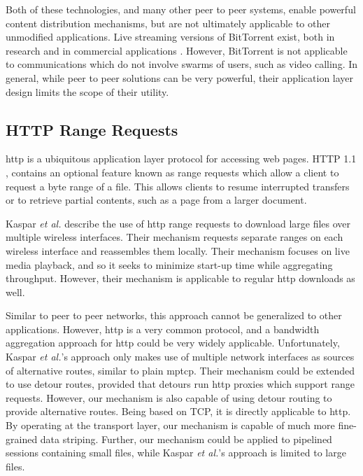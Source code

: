 \documentclass{cwru}
\begin{document}
Both of these technologies, and many other peer to peer systems, enable powerful
content distribution mechanisms, but are not ultimately applicable to other
unmodified applications. Live streaming versions of BitTorrent exist, both in
research \cite{mol2009design} and in commercial applications
\cite{ruckert2014clubbing}. However, BitTorrent is not applicable to
communications which do not involve swarms of users, such as video calling. In
general, while peer to peer solutions can be very powerful, their application
layer design limits the scope of their utility.

\subsection{HTTP Range Requests}

\ac{http} is a ubiquitous application layer protocol for accessing web pages.
HTTP 1.1 \cite{rfc2616}, contains an optional feature known as range requests
\cite{rfc7233} which allow a client to request a byte range of a file. This
allows clients to resume interrupted transfers or to retrieve partial contents,
such as a page from a larger document.

Kaspar \textit{et al.} \cite{kaspar2010enhancing} describe the use of \ac{http}
range requests to download large files over multiple wireless interfaces. Their
mechanism requests separate ranges on each wireless interface and reassembles
them locally. Their mechanism focuses on live media playback, and so it seeks to
minimize start-up time while aggregating throughput. However, their mechanism is
applicable to regular \ac{http} downloads as well.

Similar to peer to peer networks, this approach cannot be generalized to other
applications. However, \ac{http} is a very common protocol, and a bandwidth
aggregation approach for \ac{http} could be very widely applicable.
Unfortunately, Kaspar \textit{et al.}'s approach only makes use of multiple
network interfaces as sources of alternative routes, similar to plain
\ac{mptcp}. Their mechanism could be extended to use detour routes, provided
that detours run \ac{http} proxies which support range requests. However, our
mechanism is also capable of using detour routing to provide alternative routes.
Being based on TCP, it is directly applicable to \ac{http}. By operating at the
transport layer, our mechanism is capable of much more fine-grained data
striping. Further, our mechanism could be applied to pipelined sessions
containing small files, while Kaspar \textit{et al.}'s approach is limited to
large files.
\end{document}
